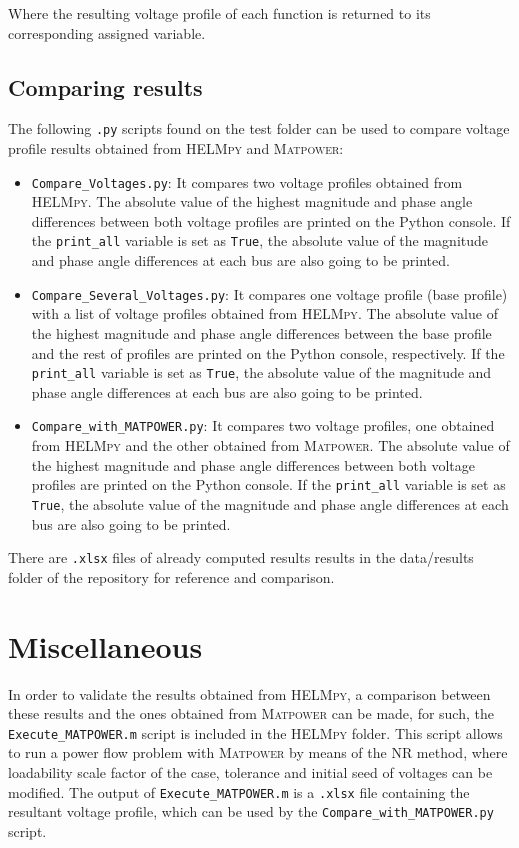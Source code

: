\documentclass[12pt]{article}
\begin{document}
Where the resulting voltage profile of each function is returned to its corresponding assigned variable.

\subsection{Comparing results}
The following \texttt{.py} scripts found on the test folder can be used to compare voltage profile results obtained from \textsc{HELMpy} and \textsc{Matpower}:
\begin{itemize}
	\item \texttt{Compare_Voltages.py}: It compares two voltage profiles obtained from \textsc{HELMpy}. The absolute value of the highest magnitude and phase angle differences between both voltage profiles are printed on the Python console. If the \texttt{print_all} variable is set as \texttt{True}, the absolute value of the magnitude and phase angle differences at each bus are also going to be printed.
	\item \texttt{Compare_Several_Voltages.py}: It compares one voltage profile (base profile) with a list of voltage profiles obtained from \textsc{HELMpy}. The absolute value of the highest magnitude and phase angle differences between the base profile and the rest of profiles are printed on the Python console, respectively. If the \texttt{print_all} variable is set as \texttt{True}, the absolute value of the magnitude and phase angle differences at each bus are also going to be printed.
	\item \texttt{Compare_with_MATPOWER.py}:  It compares two voltage profiles, one obtained from \textsc{HELMpy} and the other obtained from \textsc{Matpower}. The absolute value of the highest magnitude and phase angle differences between both voltage profiles are printed on the Python console. If the \texttt{print_all} variable is set as \texttt{True}, the absolute value of the magnitude and phase angle differences at each bus are also going to be printed.
\end{itemize}

There are \texttt{.xlsx} files of already computed results results in the data/results folder of the repository for reference and comparison.

\section{Miscellaneous}
In order to validate the results obtained from \textsc{HELMpy}, a comparison between these results and the ones obtained from \textsc{Matpower} can be made, for such, the \texttt{\mbox{Execute_MATPOWER.m}} script is included in the \textsc{HELMpy} folder. This script allows to run a power flow problem with \textsc{Matpower} by means of the NR method, where loadability scale factor of the case, tolerance and initial seed of voltages can be modified. The output of \texttt{Execute_MATPOWER.m} is a \texttt{.xlsx} file containing the resultant voltage profile, which can be used by the \texttt{\mbox{Compare_with_MATPOWER.py}} script.
\end{document}

